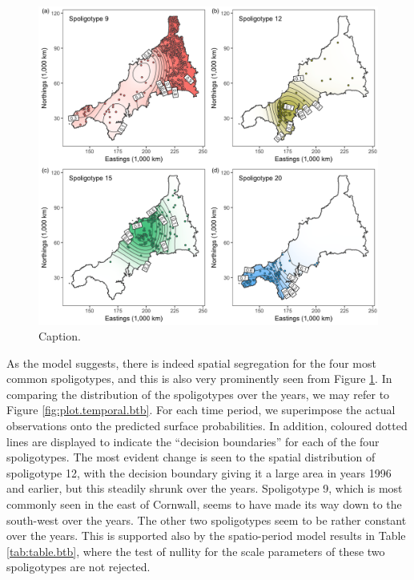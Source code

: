 \documentclass[a4paper,showframe,11pt]{report}\usepackage[]{graphicx}\usepackage[]{color}
\makeatletter
\newenvironment{kframe}{%
 \def\at@end@of@kframe{}%
 \ifinner\ifhmode%
  \def\at@end@of@kframe{\end{minipage}}%
  \begin{minipage}{\columnwidth}%
 \fi\fi%
 \def\FrameCommand##1{\hskip\@totalleftmargin \hskip-\fboxsep
 \colorbox{shadecolor}{##1}\hskip-\fboxsep
     \hskip-\linewidth \hskip-\@totalleftmargin \hskip\columnwidth}%
 \MakeFramed {\advance\hsize-\width
   \@totalleftmargin\z@ \linewidth\hsize
   \@setminipage}}%
 {\par\unskip\endMakeFramed%
 \at@end@of@kframe}
\newenvironment{knitrout}{}{} %
\makeatother
\begin{document}
\begin{knitrout}
\color{fgcolor}\begin{kframe}
\singlespacing\end{kframe}\begin{figure}[h]

{\centering \includegraphics[width=\linewidth]{figure/05-plot_btb-1} 

}

\caption[Caption]{Caption.}\label{fig:plot.btb}
\end{figure}


\end{knitrout}

As the model suggests, there is indeed spatial segregation for the four most common spoligotypes, and this is also very prominently seen from Figure \ref{fig:plot.btb}.
In comparing the distribution of the spoligotypes over the years, we may refer to Figure \ref{fig:plot.temporal.btb}.
For each time period, we superimpose the actual observations onto the predicted surface probabilities.
In addition, coloured dotted lines are displayed to indicate the ``decision boundaries'' for each of the four spoligotypes.
The most evident change is seen to the spatial distribution of spoligotype 12, with the decision boundary giving it a large area in years 1996 and earlier, but this steadily shrunk over the years.
Spoligotype 9, which is most commonly seen in the east of Cornwall, seems to have made its way down to the south-west over the years.
The other two spoligotypes seem to be rather constant over the years.
This is supported also by the spatio-period model results in Table \ref{tab:table.btb}, where the test of nullity for the scale parameters of these two spoligotypes are not rejected.
\end{document}

